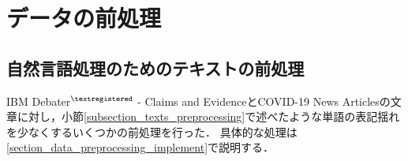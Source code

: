 \documentclass[12pt,a4j]{jreport}
\begin{document}
\section{データの前処理}
\label{section_preprocessing_data}

\subsection{自然言語処理のためのテキストの前処理}
IBM Debater$^{\textregistered}$ - Claims and EvidenceとCOVID-19 News Articlesの文章に対し，小節\ref{subsection_texts_preprocessing}で述べたような単語の表記揺れを少なくするいくつかの前処理を行った．
具体的な処理は\ref{section_data_preprocessing_implement}で説明する．


\end{document}
